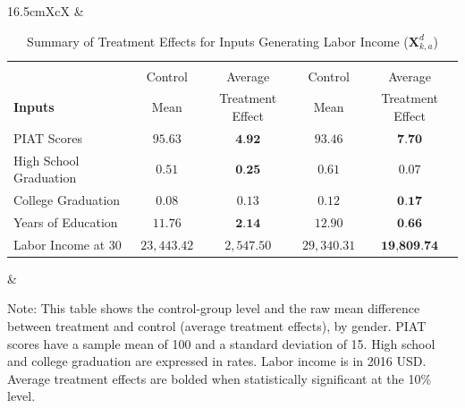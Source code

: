 \begin{table}[!htbpt]
\begin{threeparttable}
\caption{Summary of Treatment Effects for Inputs Generating Labor Income ($\bm{X}^d_{k,a}$)} \label{table:summint}
\centering
\footnotesize
\begin{tabularx}{16.5cm}{XcX}
& \begin{tabular}{lcccc} \toprule
& \mc{2}{c}{Females} & \mc{2}{c}{Males} \\
& Control & Average & Control & Average  \\
\textbf{Inputs} & Mean & Treatment Effect & Mean & Treatment Effect  \\
\midrule
PIAT Scores & $     95.63 $  & $      \textbf{4.92} $ & $     93.46 $ & $      \textbf{7.70} $ \\
High School Graduation & $      0.51 $ & $     \textbf{0.25} $ & $      0.61 $ & $      0.07 $ \\
College Graduation & $      0.08 $ & $      0.13 $ & $      0.12 $ & $      \textbf{0.17} $ \\
Years of Education & $     11.76 $ & $      \textbf{2.14} $ & $     12.90 $ & $      \textbf{0.66} $ \\
Labor Income at 30  & $ 23,443.42 $ & $  2,547.50 $ & $ 29,340.31 $ & $\textbf{19,809.74} $ \\ \bottomrule
\end{tabular} &
\end{tabularx}
\begin{tablenotes}
\footnotesize
\item Note: This table shows the control-group level and the raw mean difference between treatment and control (average treatment effects), by gender. PIAT scores have a sample mean of 100 and a standard deviation of 15. High school and college graduation are expressed in rates. Labor income is in 2016 USD. Average treatment effects are bolded when statistically significant at the 10\% level.
\end{tablenotes}
\end{threeparttable}
\end{table}

